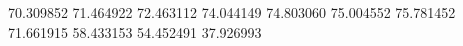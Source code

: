 70.309852
71.464922
72.463112
74.044149
74.803060
75.004552
75.781452
71.661915
58.433153
54.452491
37.926993
